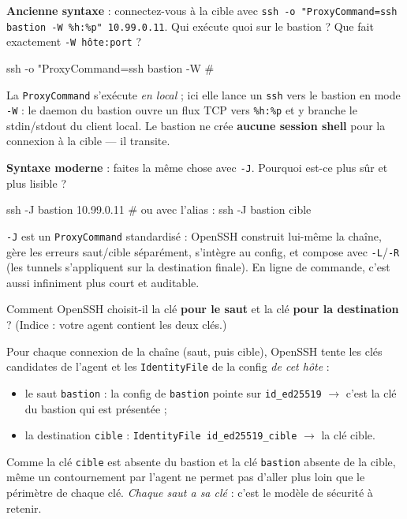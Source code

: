 \documentclass[a4paper,10pt]{exam}
\begin{document}
\begin{questions}
\question \textbf{Ancienne syntaxe} : connectez-vous à la cible avec
\texttt{ssh -o "ProxyCommand=ssh bastion -W \%h:\%p" 10.99.0.11}. Qui exécute quoi sur
le bastion ? Que fait exactement \texttt{-W hôte:port} ?
\begin{solution}
\begin{bashcode}
ssh -o "ProxyCommand=ssh bastion -W %
# %
\end{bashcode}
La \texttt{ProxyCommand} s'exécute \emph{en local} ; ici elle lance un \texttt{ssh} vers
le bastion en mode \texttt{-W} : le daemon du bastion ouvre un flux TCP vers
\texttt{\%h:\%p} et y branche le stdin/stdout du client local. Le bastion ne crée
\textbf{aucune session shell} pour la connexion à la cible — il transite.
\end{solution}
\question \textbf{Syntaxe moderne} : faites la même chose avec \texttt{-J}. Pourquoi est-ce
plus sûr et plus lisible ?
\begin{solution}
\begin{bashcode}
ssh -J bastion 10.99.0.11
# ou avec l'alias :
ssh -J bastion cible
\end{bashcode}
\texttt{-J} est un \texttt{ProxyCommand} standardisé : OpenSSH construit lui-même la
chaîne, gère les erreurs saut/cible séparément, s'intègre au config, et compose avec
\texttt{-L}/\texttt{-R} (les tunnels s'appliquent sur la destination finale). En ligne de
commande, c'est aussi infiniment plus court et auditable.
\end{solution}
\question Comment OpenSSH choisit-il la clé \textbf{pour le saut} et la clé \textbf{pour
la destination} ? (Indice : votre agent contient les deux clés.)
\begin{solution}
Pour chaque connexion de la chaîne (saut, puis cible), OpenSSH tente les clés candidates
de l'agent et les \texttt{IdentityFile} de la config \emph{de cet hôte} :
\begin{itemize}
  \item le saut \texttt{bastion} : la config de \texttt{bastion} pointe sur
        \texttt{id\_ed25519} $\rightarrow$ c'est la clé du bastion qui est présentée ;
  \item la destination \texttt{cible} : \texttt{IdentityFile id\_ed25519\_cible} $\rightarrow$
        la clé cible.
\end{itemize}
Comme la clé \texttt{cible} est absente du bastion et la clé \texttt{bastion} absente de la
cible, même un contournement par l'agent ne permet pas d'aller plus loin que le périmètre
de chaque clé. \emph{Chaque saut a sa clé} : c'est le modèle de sécurité à retenir.

\end{solution}
\end{questions}
\end{document}
